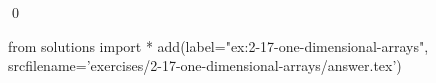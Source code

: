 
\begin{ex}
  \label{ex:2-17-one-dimensional-arrays}
  
  \qed
\end{ex}
\begin{python0}
from solutions import *
add(label="ex:2-17-one-dimensional-arrays",
    srcfilename='exercises/2-17-one-dimensional-arrays/answer.tex')
\end{python0}
